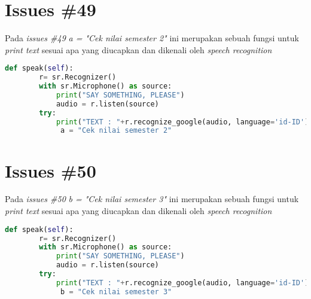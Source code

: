 \section{Issues \#49}
Pada \textit{issues \#49} \textit{a = "Cek nilai semester 2"
} ini merupakan sebuah fungsi untuk \textit{print text} sesuai apa yang diucapkan dan dikenali oleh \textit{speech recognition}
\begin{lstlisting}[language=Python]
def speak(self):
        r= sr.Recognizer()
        with sr.Microphone() as source:
            print("SAY SOMETHING, PLEASE")
            audio = r.listen(source)
        try:
            print("TEXT : "+r.recognize_google(audio, language='id-ID'))
             a = "Cek nilai semester 2"
\end{lstlisting}

\section{Issues \#50}
Pada \textit{issues \#50} \textit{b = "Cek nilai semester 3"} ini merupakan sebuah fungsi untuk \textit{print text} sesuai apa yang diucapkan dan dikenali oleh \textit{speech recognition}
\begin{lstlisting}[language=Python]
def speak(self):
        r= sr.Recognizer()
        with sr.Microphone() as source:
            print("SAY SOMETHING, PLEASE")
            audio = r.listen(source)
        try:
            print("TEXT : "+r.recognize_google(audio, language='id-ID'))
             b = "Cek nilai semester 3"
\end{lstlisting}

